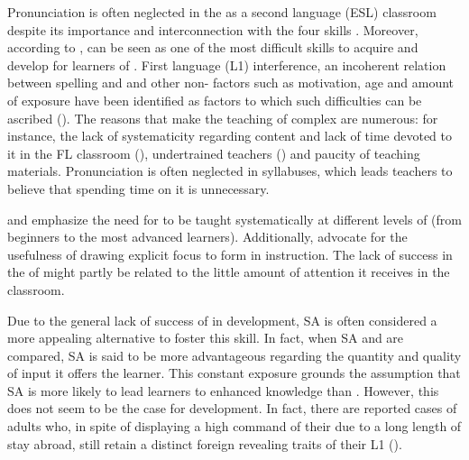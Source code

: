 \documentclass[output=paper]{langsci/langscibook}
\begin{document}
Pronunciation is often neglected in the  as a second language (ESL) classroom despite its importance and interconnection with the four  skills \citep{DarcyEtAl2012}. Moreover, according to \citet{CalvoBenzies2014,CalvoBenzies2016},   can be seen as one of the most difficult skills to acquire and develop for  learners of . First language (L1) interference, an incoherent relation between spelling and  and other non- factors such as motivation, age and amount of exposure have been identified as factors to which such difficulties can be ascribed (\citealt{DarcyEtAl2012,CalvoBenzies2014}). The reasons that make the teaching of  complex are numerous: for instance, the lack of systematicity regarding content and lack of time devoted to it in the FL classroom (\citealt{DerwingFoote2011}), undertrained teachers (\citealt{Derwing2010,FooteEtAl2011}) and paucity of teaching materials. Pronunciation is often neglected in syllabuses, which leads teachers to believe that spending time on it is unnecessary. 



\citet{DarcyEtAl2012} and \citet{CalvoBenzies2014} emphasize the need for  to be taught systematically at different levels of  (from beginners to the most advanced learners). Additionally, \citet{GordonDarcy2012} advocate for the usefulness of drawing explicit focus to form in  instruction. The lack of success in the  of   might partly be related to the little amount of attention it receives in the  classroom.



Due to the general lack of success of  in   development, SA is often considered a more appealing alternative to foster this  skill. In fact, when SA and  are compared, SA is said to be more advantageous regarding the quantity and quality of input it offers the learner. This constant exposure grounds the assumption that SA is more likely to lead learners to enhanced  knowledge than . However, this does not seem to be the case for   development. In fact, there are reported cases of adults who, in spite of displaying a high command of their  due to a long length of stay abroad, still retain a distinct foreign  revealing  traits of their L1 (\citealt{DaltonSeidlhofer1994,FlegeFrieda1997}).
\end{document}

